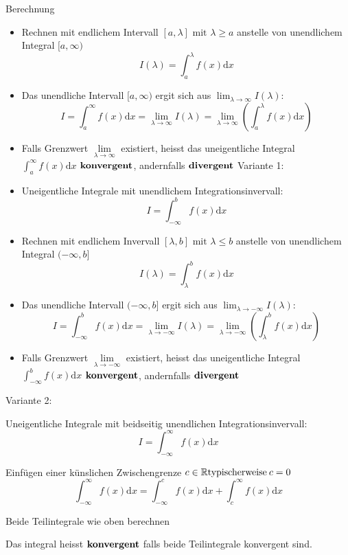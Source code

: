 \begin{KR}{Berechnung}\\
	\begin{itemize}
	\item Rechnen mit endlichem Intervall \([a,\lambda] \text{ mit } \lambda \ge a \) anstelle von unendlichem
		Integral \([a,\infty) \)
		\[I(\lambda)=\int_a^{\lambda}{f(x)\mathrm{d}x} \]
	\item Das unendliche Intervall \([a,\infty) \) ergit sich aus \(\lim_{\lambda \rightarrow
		\infty}I(\lambda) \):
		\[I=\int_a^{\infty}{f(x)\mathrm{d}x}=\underset{\lambda \rightarrow \infty}{\lim}I(\lambda)=
		\underset{\lambda \rightarrow \infty}{\lim}\left(\int_a^{\lambda}{f(x)\mathrm{d}x}\right) \]
	\item Falls Grenzwert \(\underset{\lambda \rightarrow \infty}{\lim}\) existiert, heisst das uneigentliche
		Integral \(\displaystyle\int_a^{\infty}{f(x)\mathrm{d}x}\) \(\bold{konvergent}\), andernfalls 
		\(\bold{divergent}\)
		\tcbline	
		Variante 1:
	\item Uneigentliche Integrale mit unendlichem Integrationsinvervall:
	\[I=\int_{-\infty}^b{f(x)\mathrm{d}x} \]
	\item Rechnen mit endlichem Invervall \([\lambda,b] \text{ mit } \lambda \le b \) anstelle von unendlichem
		Integral \((-\infty,b] \)
		\[I(\lambda)=\int_{\lambda}^b{f(x)\mathrm{d}x} \]
	\item Das unendliche Intervall \((-\infty,b] \) ergit sich aus \(\lim_{\lambda \rightarrow
		-\infty}I(\lambda) \):
		\[I=\int_{-\infty}^b{f(x)\mathrm{d}x}=\underset{\lambda \rightarrow -\infty}{\lim}I(\lambda)=
		\underset{\lambda \rightarrow -\infty}{\lim}\left(\int_{\lambda}^b{f(x)\mathrm{d}x}\right) \]
	\item Falls Grenzwert \(\underset{\lambda \rightarrow -\infty}{\lim}\) existiert, heisst das uneigentliche
		Integral \(\displaystyle\int_{-\infty}^b{f(x)\mathrm{d}x}\) \(\bold{konvergent}\), andernfalls 
		\(\bold{divergent}\)
	\end{itemize}
	\tcbline
	Variante 2:
\item Uneigentliche Integrale mit beidseitig unendlichen Integrationsinvervall:
	\[I=\int_{-\infty}^{\infty}{f(x)\mathrm{d}x}\]
\item Einfügen einer künslichen Zwischengrenze \(c \in \mathbb{R}\\\text{typischerweise}\:c=0 \)
	\[\int_{-\infty}^{\infty}{f(x)\mathrm{d}x}=\int_{-\infty}^{c}{f(x)\mathrm{d}x}+\int_c^{\infty}{f(x)\mathrm{d}x} 
	\]
\item Beide Teilintegrale wie oben berechnen
\item Das integral heisst \(\bold{konvergent}\) falls beide Teilintegrale konvergent sind.
\end{KR}
